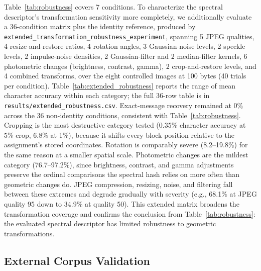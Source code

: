 \documentclass[preprint,12pt]{elsarticle}
\theoremstyle{plain}
\providecommand{\DIFaddtex}[1]{{\protect\color{blue} \sf #1}} %
\providecommand{\DIFdeltex}[1]{{\protect\color{red} \scriptsize #1}} %
\providecommand{\DIFaddbegin}{} %
\providecommand{\DIFaddend}{} %
\providecommand{\DIFdelbegin}{} %
\providecommand{\DIFdelend}{} %
\providecommand{\DIFadd}[1]{\texorpdfstring{\DIFaddtex{#1}}{#1}} %
\providecommand{\DIFdel}[1]{\texorpdfstring{\DIFdeltex{#1}}{}} %
\providecommand{\DIFscaledelfig}{0.5}
\newlength{\DIFdelgraphicswidth} %
\newlength{\DIFdelgraphicsheight} %
\providecommand{\DIFaddincludegraphics}[2][]{{\color{blue}\fbox{\DIFOincludegraphics[#1]{#2}}}} %
\providecommand{\DIFdelincludegraphics}[2][]{%
\sbox{\DIFdelgraphicsbox}{\DIFOincludegraphics[#1]{#2}}%
\settoboxwidth{\DIFdelgraphicswidth}{\DIFdelgraphicsbox} %
\settoboxtotalheight{\DIFdelgraphicsheight}{\DIFdelgraphicsbox} %
\scalebox{\DIFscaledelfig}{%
\parbox[b]{\DIFdelgraphicswidth}{\usebox{\DIFdelgraphicsbox}\\[-\baselineskip] \rule{\DIFdelgraphicswidth}{0em}}\llap{\resizebox{\DIFdelgraphicswidth}{\DIFdelgraphicsheight}{%
\setlength{\unitlength}{\DIFdelgraphicswidth}%
\begin{picture}(1,1)%
\thicklines\linethickness{2pt} %
{\color[rgb]{1,0,0}\put(0,0){\framebox(1,1){}}}%
{\color[rgb]{1,0,0}\put(0,0){\line( 1,1){1}}}%
{\color[rgb]{1,0,0}\put(0,1){\line(1,-1){1}}}%
\end{picture}%
}\hspace*{3pt}}} %
} %
\DeclareRobustCommand{\DIFaddbegin}{\DIFOaddbegin \let\includegraphics\DIFaddincludegraphics} %
\DeclareRobustCommand{\DIFaddend}{\DIFOaddend \let\includegraphics\DIFOincludegraphics} %
\DeclareRobustCommand{\DIFdelbegin}{\DIFOdelbegin \let\includegraphics\DIFdelincludegraphics} %
\DeclareRobustCommand{\DIFdelend}{\DIFOaddend \let\includegraphics\DIFOincludegraphics} %
\renewcommand{\DIFdel}[1]{}
\renewcommand{\DIFdelincludegraphics}[2][]{}
\begin{document}
Table~\ref{tab:robustness} covers 7 conditions. To characterize the spectral
descriptor's transformation sensitivity more completely, we additionally
evaluate a 36-condition matrix plus the identity reference, produced by
\texttt{extended\_transformation\_robustness\_experiment}, spanning 5 JPEG
qualities, 4 resize-and-restore ratios, 4 rotation angles, 3 Gaussian-noise
levels, 2 speckle levels, 2 impulse-noise densities, 2 Gaussian-filter and 2
median-filter kernels, 6 photometric changes (brightness, contrast, gamma),
2 crop-and-restore levels, and 4 combined transforms, over the eight
controlled images at 100 bytes (40 trials per condition). Table~\ref{tab:extended_robustness}
reports the range of mean character accuracy within each category; the full
36-row table is in \texttt{results/extended\_robustness.csv}. \DIFdelbegin \DIFdel{No }\DIFdelend \DIFaddbegin \DIFadd{Exact-message recovery remained at 0\% across the 36 }\DIFaddend non-identity
\DIFdelbegin \DIFdel{condition reaches exact message recovery }\DIFdelend \DIFaddbegin \DIFadd{conditions}\DIFaddend , consistent with
Table~\ref{tab:robustness}. Cropping is the most destructive category tested
(0.35\% character accuracy at 5\% crop, 6.8\% at 1\%), because it shifts
every block position relative to the assignment's stored coordinates.
Rotation is comparably severe (8.2--19.8\%) for the same reason at a smaller
spatial scale. Photometric changes are the mildest category (76.7--97.2\%),
since brightness, contrast, and gamma adjustments preserve the ordinal
comparisons the spectral hash relies on more often than geometric changes
do. JPEG compression, resizing, noise, and filtering fall between these
extremes and degrade gradually with severity (e.g., 68.1\% at JPEG quality 95
down to 34.9\% at quality 50). This extended matrix broadens the
transformation coverage and confirms the conclusion from Table~\ref{tab:robustness}:
the evaluated spectral descriptor has limited robustness to geometric transformations.

\begin{table}[!t]
\centering
\caption{Extended Transformation Matrix: Character Accuracy Range by Category (100 Bytes, 40 Trials per Condition)}
\label{tab:extended_robustness}

\end{table}

\subsection{External Corpus Validation}
\end{document}
